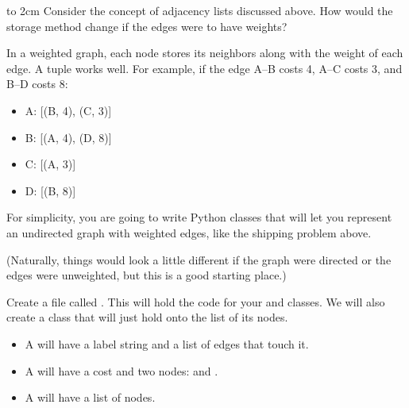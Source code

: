 \begin{Exercise}[title={Weighted Adjacency Lists}, label={ex:dir_adj}]

  \vspace{2cm}

  \begin{center}
    \vbox to 2cm{\vfil
        Consider the concept of adjacency lists discussed above. How would the storage method change if the edges were to have weights?
        \vfil}
  \end{center}

\end{Exercise}

\begin{Answer}[ref={ex:dir_adj}]

  In a weighted graph, each node stores its neighbors along with the weight
of each edge. A tuple works well. For example, if the edge A--B costs 4,
A--C costs 3, and B--D costs 8:
  \begin{itemize}
    \item A: [(B, 4), (C, 3)]
    \item B: [(A, 4), (D, 8)]
    \item C: [(A, 3)]
    \item D: [(B, 8)]
  \end{itemize}

\end{Answer}

For simplicity, you are going to write Python classes that will let
you represent an undirected graph with weighted edges, like the
shipping problem above.

(Naturally, things would look a little different if the graph were
directed or the edges were unweighted, but this is a good starting
place.)

Create a file called . This will hold the code for
your  and  classes. We will also
create a  class that will just hold onto the list of
its nodes.

\begin{itemize}
  \item A  will have a label string and a list of edges that touch it.
  \item A  will have a cost and two nodes:  and .
  \item A  will have a list of nodes.
\end{itemize}

